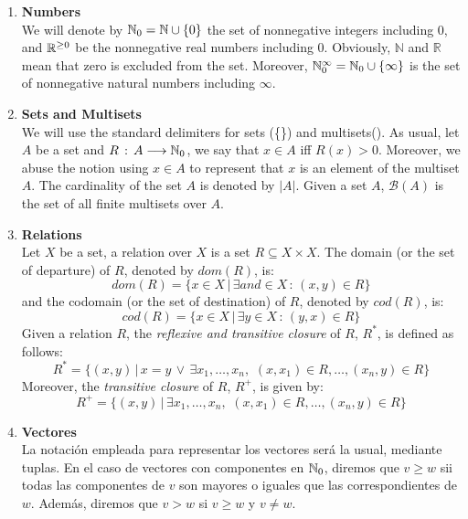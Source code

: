 \begin{enumerate}
\item {\bf Numbers}\\
We will denote by $\mathbb{N}_{0} = \mathbb{N} \cup \{0\}$ the set of nonnegative integers including 0,
and $\mathbb{R}^{\geq 0}$ be the nonnegative real numbers including 0. Obviously, $\mathbb{N}$
and $\mathbb{R}$ mean that zero is excluded from the set. Moreover,
$\mathbb{N}_{0}^{\infty} = \mathbb{N}_{0} \cup \left\{\infty \right\}$ is the set of nonnegative natural numbers including $\infty$. 

\item {\bf Sets and Multisets}\\
We will use the standard delimiters for sets (\{\}) and multisets(\multiset{}). 
As usual, let $A$ be a set and $R\,:\,A \longrightarrow \mathbb{N}_{0}$, we say 
that $x \in A$ iff $R(x) > 0$.
Moreover, we abuse the notion using $x \in A$ to represent that $x$ is an element of
the multiset $A$. The cardinality of the set $A$
is denoted by $|A|$. Given a set $A$,
${\mathcal B}(A)$ is the set of all finite multisets over $A$.


\item {\bf Relations}\\
Let $X$ be a set, a relation over $X$ is a set $R \subseteq X \times X$. 
The domain (or the set of departure) of $R$, denoted by $dom(R)$, is:
\[dom(R) = \{ x \in X \,|\, \exists
and \in X\,:\, (x,y) \in R \}\]
and the codomain (or the set of destination) of $R$, denoted by $cod(R)$, is:
\[cod(R) = \{ x \in X \,|\, \exists y \in X\,:\,(y,x) \in R\}\]
Given a relation $R$, the {\it reflexive and transitive closure} of $R$, $R^*$, is defined as follows:
\[ R^* = \{ (x,y)\,|\,x=y \,\vee\,
\exists x_1,\ldots,x_n,\,\,(x,x_1)\in R,\ldots,(x_n,y) \in R\}\]
Moreover, the {\it transitive closure} of $R$, $R^+$, is given by:
\[R^+ = \{ (x,y)\,|\,
\exists x_1,\ldots,x_n,\,\,(x,x_1)\in R,\ldots,(x_n,y) \in R\}\]

\item {\bf Vectores}\\
La notaci\'{o}n empleada para representar los vectores
ser\'{a} la usual, mediante tuplas. En el caso de vectores con componentes
en $\mathbb{N}_{0}$, diremos que $v \geq w$ sii todas las componentes de $v$
son mayores o iguales que las correspondientes de $w$. Adem\'{a}s,
diremos que $v > w$ si $v \geq w$ y $v \neq w$.
\end{enumerate}


